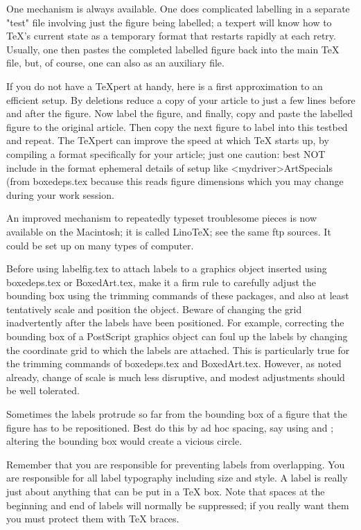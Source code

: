      One mechanism is always available.  One does complicated
labelling in a separate "test" file involving just the figure being
labelled;  a texpert will know how to \dump TeX's current state as
a temporary format that restarts rapidly at each retry.  Usually,
one then pastes the completed labelled figure back into the main
TeX file, but, of course, one can also  as an auxiliary
file.

     If you do not have a TeXpert at handy, here is a first
approximation to an efficient setup. By deletions reduce a copy
of your article to just a few lines before and after the figure.
Now label the figure, and finally, copy and paste the labelled
figure to the original article. Then copy the next figure to label
into this testbed and repeat. The TeXpert can improve the  speed
at which TeX starts up, by compiling a format specifically for
your article; just one caution: best NOT include in the format
ephemeral details of setup like \Set<mydriver>ArtSpecials (from
boxedeps.tex because this reads  figure dimensions which you may
change during your work session.

     An improved mechanism to repeatedly typeset troublesome
pieces is now available on the Macintosh; it is called LinoTeX;
see the same ftp sources.  It could be set up on many types
of computer.

     Before using labelfig.tex to attach labels to a graphics
object inserted using boxedeps.tex or BoxedArt.tex, make it a
firm rule to carefully adjust the bounding box using the trimming
commands of these packages, and also at least tentatively scale
and position the object. Beware of changing the grid inadvertently
after the labels have been positioned.  For example, correcting
the bounding box of a PostScript graphics object can foul up the
labels by changing the coordinate grid to which the labels are
attached. This is particularly true for the trimming  commands of
boxedeps.tex and BoxedArt.tex. However, as noted already, change
of scale is much less disruptive, and modest adjustments should be
well tolerated.

     Sometimes the labels protrude so far from the bounding box
of a figure that the figure has to be repositioned.  Best do this
by ad hoc spacing, say using \hglue and \vglue; altering the
bounding box would create a vicious circle.

     Remember that you are responsible for preventing labels
from overlapping. You are responsible for all label typography
including size and style. A label is really just about anything
that can be put in a TeX box. Note that spaces at the beginning
and end of labels will normally be suppressed; if you really want
them you must protect them with TeX braces.

